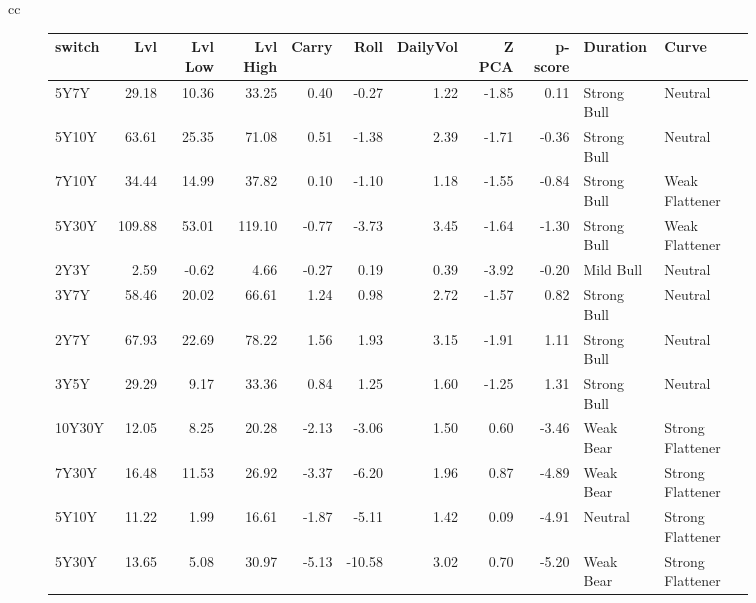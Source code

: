 \documentclass[a4paper,oneside]{report}
\begin{document}
\begin{figure}[htbp]
\begin{tabular}[c]{cc}
\begin{subfigure}[c]{0.5\textwidth}
\begin{adjustbox}{max width=\textwidth}
\begin{tabular}{lrrrrrrrrll}
\hline
 switch &     Lvl &  Lvl Low &  Lvl High &  Carry &   Roll &  DailyVol &  Z PCA &  p-score &     Duration &             Curve \\
\hline
   5Y7Y &   29.18 &    10.36 &     33.25 &   0.40 &  -0.27 &      1.22 &  -1.85 &     0.11 &  Strong Bull &           Neutral \\
  5Y10Y &   63.61 &    25.35 &     71.08 &   0.51 &  -1.38 &      2.39 &  -1.71 &    -0.36 &  Strong Bull &           Neutral \\
  7Y10Y &   34.44 &    14.99 &     37.82 &   0.10 &  -1.10 &      1.18 &  -1.55 &    -0.84 &  Strong Bull &    Weak Flattener \\
  5Y30Y &  109.88 &    53.01 &    119.10 &  -0.77 &  -3.73 &      3.45 &  -1.64 &    -1.30 &  Strong Bull &    Weak Flattener \\
   2Y3Y &    2.59 &    -0.62 &      4.66 &  -0.27 &   0.19 &      0.39 &  -3.92 &    -0.20 &    Mild Bull &           Neutral \\
   3Y7Y &   58.46 &    20.02 &     66.61 &   1.24 &   0.98 &      2.72 &  -1.57 &     0.82 &  Strong Bull &           Neutral \\
   2Y7Y &   67.93 &    22.69 &     78.22 &   1.56 &   1.93 &      3.15 &  -1.91 &     1.11 &  Strong Bull &           Neutral \\
   3Y5Y &   29.29 &     9.17 &     33.36 &   0.84 &   1.25 &      1.60 &  -1.25 &     1.31 &  Strong Bull &           Neutral \\
 10Y30Y &   12.05 &     8.25 &     20.28 &  -2.13 &  -3.06 &      1.50 &   0.60 &    -3.46 &    Weak Bear &  Strong Flattener \\
  7Y30Y &   16.48 &    11.53 &     26.92 &  -3.37 &  -6.20 &      1.96 &   0.87 &    -4.89 &    Weak Bear &  Strong Flattener \\
  5Y10Y &   11.22 &     1.99 &     16.61 &  -1.87 &  -5.11 &      1.42 &   0.09 &    -4.91 &      Neutral &  Strong Flattener \\
  5Y30Y &   13.65 &     5.08 &     30.97 &  -5.13 & -10.58 &      3.02 &   0.70 &    -5.20 &    Weak Bear &  Strong Flattener \\
\hline
\end{tabular}
\end{adjustbox}
 \end{subfigure}\\
 

\end{tabular}
\end{figure}
\end{document}
